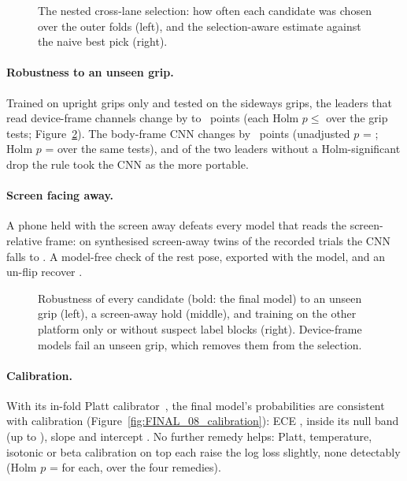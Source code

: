 \begin{figure}[htbp]
\centering
{}
\caption{The nested cross-lane selection: how often each candidate was chosen over the  outer
folds (left), and the selection-aware estimate against the naive best pick (right).}
\label{fig:FINAL_03_nested_selection}
\end{figure}

\paragraph{Robustness to an unseen grip.} Trained on upright grips only and tested on the sideways grips, the leaders
that read device-frame channels change by  to ~points (each
Holm $p \le$  over the  grip tests;
Figure~\ref{fig:FINAL_06_robustness}). The body-frame CNN changes by ~points (unadjusted
$p$ = ; Holm $p$ =  over the same tests), and of the two leaders
without a Holm-significant drop the rule took the CNN as the more portable.

\paragraph{Screen facing away.} A phone held with the screen away defeats every model that reads the
screen-relative frame: on synthesised screen-away twins of the recorded trials the CNN falls to
. A model-free check of the rest pose, exported with the model, and an un-flip recover
.

\begin{figure}[htbp]
\centering
{}
\caption{Robustness of every candidate (bold: the final model) to an unseen grip (left), a screen-away hold
(middle), and training on the other platform only or without suspect label blocks (right). Device-frame models fail
an unseen grip, which removes them from the selection.}
\label{fig:FINAL_06_robustness}
\end{figure}

\paragraph{Calibration.} With its in-fold Platt calibrator~\cite{platt1999probabilistic}, the final model's
probabilities are consistent with calibration (Figure~\ref{fig:FINAL_08_calibration}): ECE ,
inside its null band (up to ), slope  and intercept
. No further remedy helps: Platt, temperature, isotonic or beta calibration on top
each raise the log loss slightly, none detectably (Holm $p$ =  for each, over the four
remedies).

